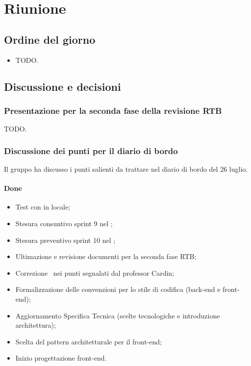 \section{Riunione}
\subsection{Ordine del giorno}
\begin{itemize}
	\item TODO.
\end{itemize}

\subsection{Discussione e decisioni}
\subsubsection{Presentazione per la seconda fase della revisione RTB}
\par TODO.

\subsubsection{Discussione dei punti per il diario di bordo}
\par Il gruppo ha discusso i punti salienti da trattare nel diario di bordo del 26 luglio.
\paragraph{Done}
\begin{itemize}
	\item Test con  in locale;
	\item Stesura consuntivo sprint 9 nel \PdP;
	\item Stesura preventivo sprint 10 nel \PdP;
	\item Ultimazione e revisione documenti per la seconda fase RTB;
	\item Correzione \AdR\ nei punti segnalati dal professor Cardin;
	\item Formalizzazione delle convenzioni per lo stile di codifica (back-end e front-end);
	\item Aggiornamento Specifica Tecnica (scelte tecnologiche e introduzione architettura);
	\item Scelta del pattern architetturale per il front-end;
	\item Inizio progettazione front-end.
\end{itemize}

